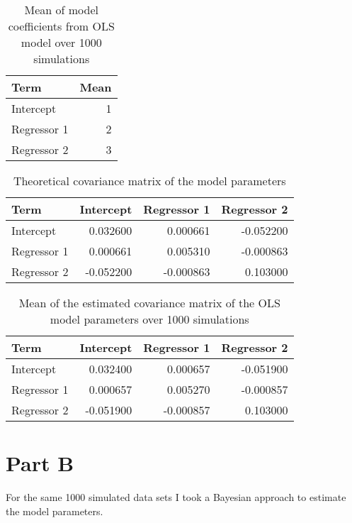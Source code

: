\documentclass[]{book}
\begin{document}
\begin{table}

\caption{\label{tab:lm-mean-coefs-q3}Mean of model coefficients from OLS model over 1000 simulations}
\centering
\begin{tabular}[t]{lr}
\toprule
Term & Mean\\
\midrule
Intercept & 1\\
Regressor 1 & 2\\
Regressor 2 & 3\\
\bottomrule
\end{tabular}
\end{table}

\begin{table}

\caption{\label{tab:theory-vcov-q3}Theoretical covariance matrix of the model parameters}
\centering
\begin{tabular}[t]{lrrr}
\toprule
Term & Intercept & Regressor 1 & Regressor 2\\
\midrule
Intercept & 0.032600 & 0.000661 & -0.052200\\
Regressor 1 & 0.000661 & 0.005310 & -0.000863\\
Regressor 2 & -0.052200 & -0.000863 & 0.103000\\
\bottomrule
\end{tabular}
\end{table}

\begin{table}

\caption{\label{tab:lm-est-vcov-q3}Mean of the estimated covariance matrix of the OLS model parameters over 1000 simulations}
\centering
\begin{tabular}[t]{lrrr}
\toprule
Term & Intercept & Regressor 1 & Regressor 2\\
\midrule
Intercept & 0.032400 & 0.000657 & -0.051900\\
Regressor 1 & 0.000657 & 0.005270 & -0.000857\\
Regressor 2 & -0.051900 & -0.000857 & 0.103000\\
\bottomrule
\end{tabular}
\end{table}

\hypertarget{part-b-2}{%
\section{Part B}\label{part-b-2}}

For the same 1000 simulated data sets I took a Bayesian approach to estimate the model parameters.
\end{document}
